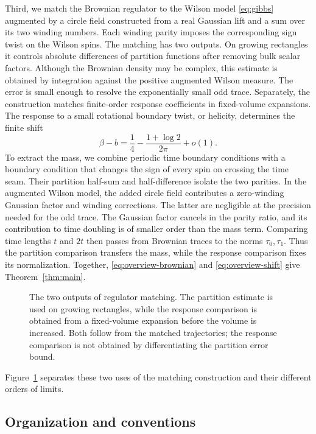 Third, we match the Brownian regulator to the Wilson model \eqref{eq:gibbs}
augmented by a circle field constructed from a real Gaussian lift and a
sum over its two winding numbers. Each winding parity imposes the
corresponding sign twist on the Wilson spins. The matching has two outputs. On
growing rectangles it controls absolute differences of partition functions
after removing bulk scalar factors. Although the Brownian density may be
complex, this estimate is obtained by integration against the positive
augmented Wilson measure. The error is small enough to resolve the
exponentially small odd trace. Separately, the construction matches
finite-order response coefficients in fixed-volume expansions. The response
to a small rotational boundary twist, or helicity, determines the finite shift
\begin{equation}\label{eq:overview-shift}
 \beta-b=\frac14-\frac{1+\log2}{2\pi}+o(1).
\end{equation}
To extract the mass, we combine periodic time boundary conditions with a
boundary condition that changes the sign of every spin on crossing the
time seam. Their partition half-sum and half-difference isolate the two
parities. In the augmented Wilson model, the added circle field contributes
a zero-winding Gaussian factor and winding corrections. The latter are
negligible at the precision needed for the odd trace. The Gaussian factor
cancels in the parity ratio, and its contribution to time doubling is of
smaller order than the mass term. Comparing time lengths \(t\) and \(2t\)
then passes from Brownian
traces to the norms \(\tau_0,\tau_1\). Thus the partition comparison
transfers the mass, while the response comparison fixes its normalization.
Together, \eqref{eq:overview-brownian} and \eqref{eq:overview-shift} give
Theorem~\ref{thm:main}.

\begin{figure}[htbp]
 \centering
 
 \caption{The two outputs of regulator matching. The partition estimate
 is used on growing rectangles, while the response comparison is obtained
 from a fixed-volume expansion before the volume is increased. Both follow
 from the matched trajectories; the response comparison is not obtained by
 differentiating the partition error bound.}
 \label{fig:comparison}
\end{figure}
Figure~\ref{fig:comparison} separates these two uses of the matching
construction and their different orders of limits.

\subsection{Organization and conventions}

